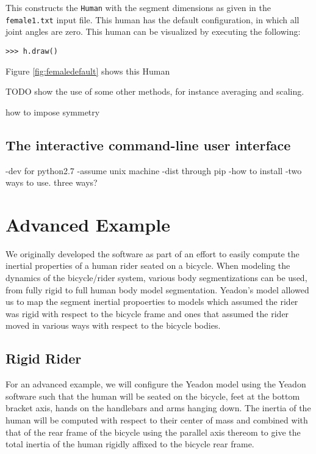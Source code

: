 \documentclass[10pt]{article}
\begin{document}
This constructs the \verb+Human+ with the segment dimensions as given in the
\verb+female1.txt+ input file. This human has the default configuration, in
which all joint angles are zero. This human can be visualized by executing the
following:


\begin{verbatim}
>>> h.draw()
\end{verbatim}

Figure \ref{fig:femaledefault} shows this Human

TODO show the use of some other methods, for instance averaging and scaling.

how to impose symmetry

\subsection*{The interactive command-line user interface}


-dev for python2.7
-assume unix machine
-dist through pip
-how to install
-two ways to use. three ways?


\section*{Advanced Example}
\label{sec:advanced-example}

We originally developed the software as part of an effort to easily compute the
inertial properties of a human rider seated on a bicycle. When modeling the
dynamics of the bicycle/rider system, various body segmentizations can be used,
from fully rigid to full human body model segmentation. Yeadon's model allowed
us to map the segment inertial propoerties to models which assumed the rider
was rigid with respect to the bicycle frame and ones that assumed the rider
moved in various ways with respect to the bicycle bodies.

\subsection*{Rigid Rider}
\label{sec:rigid-rider}

For an advanced example, we will configure the Yeadon model using the Yeadon
software such that the human will be seated on the bicycle, feet at the bottom
bracket axis, hands on the handlebars and arms hanging down. The inertia of the
human will be computed with respect to their center of mass and combined with
that of the rear frame of the bicycle using the parallel axis thereom to give
the total inertia of the human rigidly affixed to the bicycle rear frame.
\end{document}
